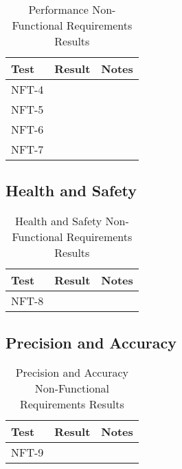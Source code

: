 \documentclass[12pt, titlepage]{article}
\begin{document}
\begin{table}[H]
\centering
    \setlength{\leftmargini}{0.4cm}
    \begin{tabular}{| >{\centering\arraybackslash}m{3cm} | 
      >{\centering\arraybackslash}m{4cm} | 
      >{\centering\arraybackslash}m{6cm} |}
    \hline
    \rowcolor[gray]{0.9}
    Test & Result & Notes\\
    \hline
    NFT-4 &  & \\
    \hline
    NFT-5 &  & \\
    \hline
    NFT-6 &  & \\
    \hline
    NFT-7 &  & \\
    \hline
    \end{tabular}
\caption{Performance Non-Functional Requirements Results}
\end{table}

\subsection{Health and Safety}

\begin{table}[H]
\centering
    \setlength{\leftmargini}{0.4cm}
    \begin{tabular}{| >{\centering\arraybackslash}m{3cm} | 
      >{\centering\arraybackslash}m{4cm} | 
      >{\centering\arraybackslash}m{6cm} |}
    \hline
    \rowcolor[gray]{0.9}
    Test & Result & Notes\\
    \hline
    NFT-8 &  & \\
    \hline
    \end{tabular}
\caption{Health and Safety Non-Functional Requirements Results}
\end{table}

\subsection{Precision and Accuracy}

\begin{table}[H]
\centering
    \setlength{\leftmargini}{0.4cm}
    \begin{tabular}{| >{\centering\arraybackslash}m{3cm} | 
      >{\centering\arraybackslash}m{4cm} | 
      >{\centering\arraybackslash}m{6cm} |}
    \hline
    \rowcolor[gray]{0.9}
    Test & Result & Notes\\
    \hline
    NFT-9 &  & \\
    \hline
    \end{tabular}
\caption{Precision and Accuracy Non-Functional Requirements Results}
\end{table}
\end{document}
